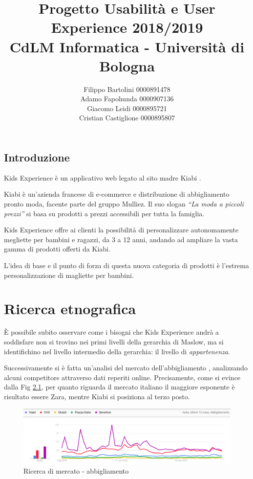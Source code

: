 \documentclass[12pt,italian,]{report}
\title{Progetto Usabilità e User Experience 2018/2019\\[0.8em]\large CdLM Informatica - Università di Bologna}
\author{Filippo Bartolini 0000891478 \\ Adamo Fapohunda 0000907136\\ Giacomo Leidi 0000895721 \\ Cristian Castiglione 0000895807}
\date{}
\begin{document}
\maketitle

{
\setcounter{tocdepth}{2}
\tableofcontents
}
\newpage
\hypertarget{introduzione}{%
\section{Introduzione}\label{introduzione}}

Kids Experience è un applicativo web legato al sito madre Kiabi \cite{kiabi}.

Kiabi è un'azienda francese di e-commerce e distribuzione di
abbigliamento pronto moda, facente parte del gruppo Mulliez. Il suo
slogan \emph{``La moda a piccoli prezzi''} si basa su prodotti a prezzi
accessibili per tutta la famiglia.

Kids Experience offre ai clienti la possibilità di personalizzare
autonomamente megliette per bambini e ragazzi, da 3 a 12 anni, andando
ad ampliare la vasta gamma di prodotti offerti da Kiabi.

L'idea di base e il punto di forza di questa nuova categoria di prodotti è l'estrema personalizzazione di magliette per bambini.

\hypertarget{ricerca-etnografica}{%
\chapter{Ricerca etnografica}\label{ricerca-etnografica}}

È possibile subito osservare come i bisogni che Kids Experience andrà a
soddisfare non si trovino nei primi livelli della gerarchia di Maslow,
ma si identifichino nel livello intermedio della gerarchia: il livello
di \emph{appartenenza}.

Successivamente si è fatta un'analisi del mercato dell'abbigliamento \cite{gt},
analizzando alcuni competitors attraverso dati reperiti online.
Precisamente, come si evince dalla Fig \ref{abbigliamo_generico}, per quanto riguarda il
mercato italiano il maggiore esponente è risultato essere Zara, mentre Kiabi si
posiziona al terzo posto.

\begin{figure}[h]
\centering
\includegraphics{img/abbigliamento_generico.png}
\caption{Ricerca di mercato - abbigliamento}
\label{abbigliamo_generico}
\end{figure}
\end{document}
